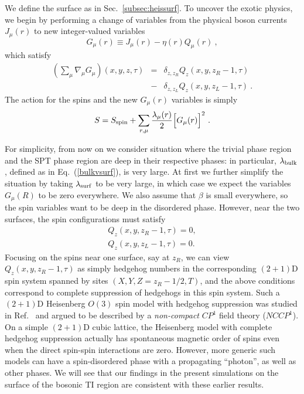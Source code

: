 \documentclass[prb,twocolumn]{revtex4-1}
\begin{document}
We define the surface as in Sec.~\ref{subsec:heissurf}. To uncover the exotic physics, we begin by performing a change of variables from the physical boson currents $J_\mu(r)$ to new integer-valued variables
\begin{equation}
G_\mu(r) \equiv J_\mu(r) - \eta(r) Q_\mu(r) ~,
\end{equation}
which satisfy 
\begin{eqnarray*}
\left(\sum_\mu \nabla_\mu G_\mu\right) (x, y, z, \tau) &=& 
\delta_{z, z_R} Q_z(x, y, z_R-1, \tau) \\
&-& \delta_{z, z_L} Q_z(x, y, z_L-1, \tau) ~. 
\end{eqnarray*}
The action for the spins and the new $G_\mu(r)$ variables is simply
\begin{equation}
S = S_{\rm spin} + \sum_{r,\mu} \frac{\lambda_\mu(r)}{2} \Big[G_\mu(r)\Big]^2 ~.
\end{equation}

For simplicity, from now on we consider situation where the trivial phase region and the SPT phase region are deep in their respective phases: in particular, $\lambda_{\rm bulk}$, defined as in Eq.~(\ref{bulkvsurf}), is very large.  At first we further simplify the situation by taking $\lambda_{\rm surf}$ to be very large, in which case we expect the variables $G_\mu(R)$ to be zero everywhere.  We also assume that $\beta$ is small everywhere, so the spin variables want to be deep in the disordered phase.  However, near the two surfaces, the spin configurations must satisfy
\begin{equation}
\begin{array}{c}
Q_z(x, y, z_R-1, \tau) = 0, \\
Q_z(x, y, z_L-1, \tau) = 0.
\end{array}
\end{equation}
Focusing on the spins near one surface, say at $z_R$, we can view $Q_z(x, y, z_R-1, \tau)$ as simply hedgehog numbers in the corresponding $(2+1)$D spin system spanned by sites $(X, Y, Z=z_R-1/2, T)$, and the above conditions correspond to complete suppression of hedgehogs in this spin system.  Such a $(2+1)$D Heisenberg $O(3)$ spin model with hedgehog suppression was studied in Ref.~ and argued to be described by a \emph{non-compact} $CP^1$ field theory ($NCCP^1$).  On a simple $(2+1)$D cubic lattice, the Heisenberg model with complete hedgehog suppression actually has spontaneous magnetic order of spins even when the direct spin-spin interactions are zero.\cite{LauDasgupta, KamalMurthy}  However, more generic such models can have a spin-disordered phase with a propagating ``photon''\cite{KamalMurthy, LesikAshvin}, as well as other phases\cite{LesikAshvin2}.  We will see that our findings in the present simulations on the surface of the bosonic TI region are consistent with these earlier results.
\end{document}
